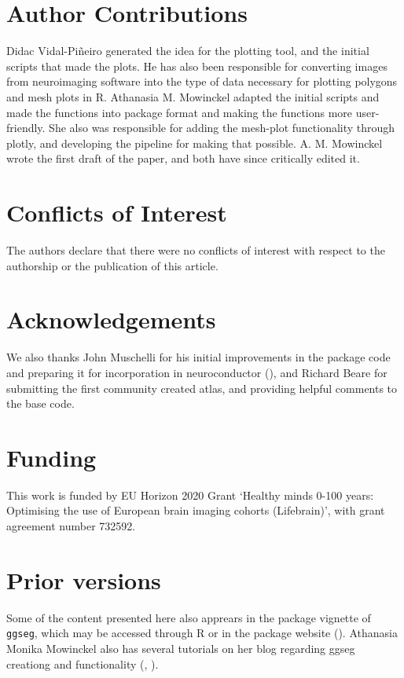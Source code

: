 \documentclass[fleqn,10pt]{wlpeerj} %
\begin{document}
\hypertarget{author-contributions}{%
\section{Author Contributions}\label{author-contributions}}

Didac Vidal-Piñeiro generated the idea for the plotting tool, and the initial scripts that made the plots.
He has also been responsible for converting images from neuroimaging software into the type of data necessary for plotting polygons and mesh plots in R.
Athanasia M. Mowinckel adapted the initial scripts and made the functions into package format and making the functions more user-friendly.
She also was responsible for adding the mesh-plot functionality through plotly, and developing the pipeline for making that possible.
A. M. Mowinckel wrote the first draft of the paper, and both have since critically edited it.

\hypertarget{conflicts-of-interest}{%
\section{Conflicts of Interest}\label{conflicts-of-interest}}

The authors declare that there were no conflicts of interest with respect to the authorship or the publication of this article.

\hypertarget{acknowledgements}{%
\section{Acknowledgements}\label{acknowledgements}}

We also thanks John Muschelli for his initial improvements in the package code and preparing it for incorporation in neuroconductor (\citeyearpar{neuroconductor}), and Richard Beare for submitting the first community created atlas, and providing helpful comments to the base code.

\hypertarget{funding}{%
\section{Funding}\label{funding}}

This work is funded by EU Horizon 2020 Grant `Healthy minds 0-100 years: Optimising the use of European brain imaging cohorts (Lifebrain)', with grant agreement number 732592.

\hypertarget{prior-versions}{%
\section{Prior versions}\label{prior-versions}}

Some of the content presented here also apprears in the package vignette of \texttt{ggseg}, which may be accessed through R or in the package website (\citet{ggseg}).
Athanasia Monika Mowinckel also has several tutorials on her blog regarding ggseg creationg and functionality (\citet{ggsegAnim}, \citet{ggsegIntro}).

\renewcommand\refname{References}

\end{document}
